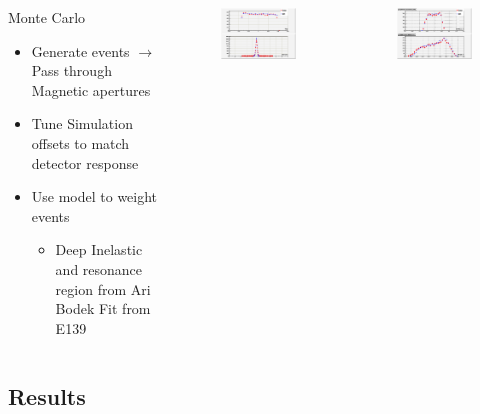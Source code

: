 \documentclass[12pt]{beamer}
\begin{document}
\begin{frame}{}
\begin{columns}
	\begin{block}{Monte Carlo}
		\begin{itemize}
			\item Generate events $\rightarrow$ Pass through Magnetic apertures
			\item Tune Simulation offsets to match detector response
			\item Use model to weight events
			\begin{itemize}
				\item Deep Inelastic and resonance region from Ari Bodek Fit from E139 \cite{bodek}
			\end{itemize}    
		\end{itemize}
	\end{block}
	\vspace{-20pt}
	\begin{figure}
		\includegraphics[width=6cm]{../images/dp_ytar_1207.png}
	\end{figure}
	\vspace{-30pt}
	\begin{figure}
		\includegraphics[width=6cm]{../images/xp_yp_foc_1207.png}
	\end{figure}
\end{columns}
\end{frame}



\subsection[Results]{Results}
\end{document}
